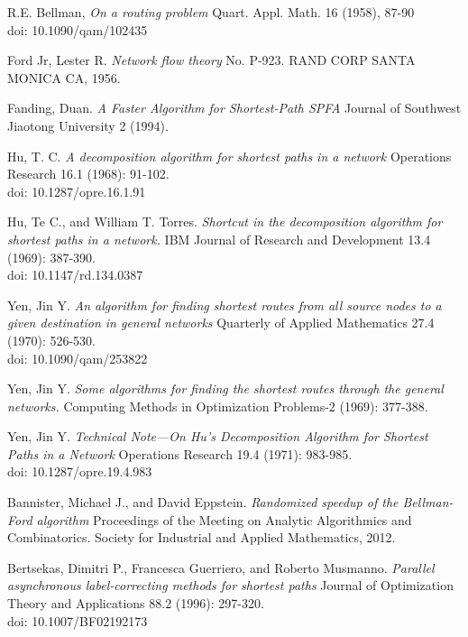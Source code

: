 \documentclass{article}
\begin{document}
\begin{thebibliography}{9}

R.E. Bellman, \textit{On a routing problem}
Quart. Appl. Math. 16 (1958), 87-90\\
doi: 10.1090/qam/102435 

Ford Jr, Lester R. \textit{Network flow theory} No. P-923. RAND CORP SANTA MONICA CA, 1956.

Fanding, Duan. \textit{A Faster Algorithm for Shortest-Path  SPFA} Journal of Southwest Jiaotong University 2 (1994).

Hu, T. C. \textit{A decomposition algorithm for shortest paths in a network} Operations Research 16.1 (1968): 91-102. \\
doi: 10.1287/opre.16.1.91

Hu, Te C., and William T. Torres. \textit{Shortcut in the decomposition algorithm for shortest paths in a network.} IBM Journal of Research and Development 13.4 (1969): 387-390.\\
doi: 10.1147/rd.134.0387
 
Yen, Jin Y. \textit{An algorithm for finding shortest routes from all source nodes to a given destination in general networks} Quarterly of Applied Mathematics 27.4 (1970): 526-530.\\
doi: 10.1090/qam/253822 

Yen, Jin Y. \textit{Some algorithms for finding the shortest routes through the general networks.} Computing Methods in Optimization Problems-2 (1969): 377-388.

Yen, Jin Y. \textit{Technical Note—On Hu's Decomposition Algorithm for Shortest Paths in a Network} Operations Research 19.4 (1971): 983-985.\\
doi: 10.1287/opre.19.4.983

Bannister, Michael J., and David Eppstein. \textit{Randomized speedup of the Bellman-Ford algorithm} Proceedings of the Meeting on Analytic Algorithmics and Combinatorics. Society for Industrial and Applied Mathematics, 2012.

Bertsekas, Dimitri P., Francesca Guerriero, and Roberto Musmanno. \textit{Parallel asynchronous label-correcting methods for shortest paths} Journal of Optimization Theory and Applications 88.2 (1996): 297-320.\\
doi: 10.1007/BF02192173


\end{thebibliography}
\end{document}
